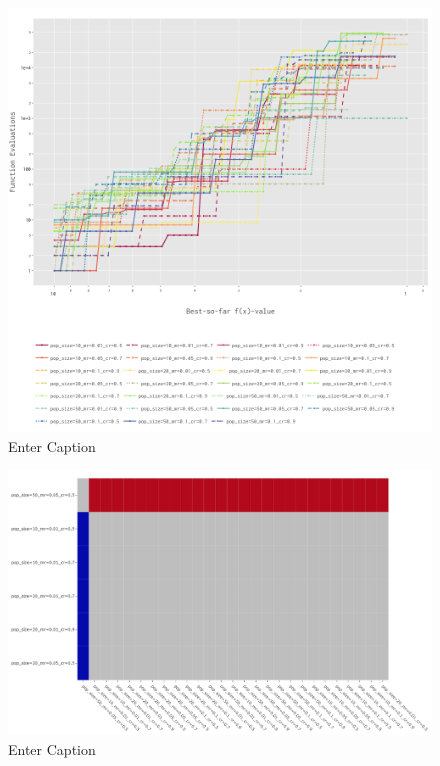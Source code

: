 \documentclass{article}
\begin{document}
\begin{figure}[h!]
    \centering
    \includegraphics[width=1\linewidth]{Graphs/Katsuura/Expected_RunTime.png}
    \caption{Enter Caption}
    \label{fig:enter-label}
\end{figure}
\begin{figure}[h!]
    \centering
    \includegraphics[width=1\linewidth]{Graphs/Katsuura/Ranking.png}
    \caption{Enter Caption}
    \label{fig:enter-label}
\end{figure}
\end{document}
